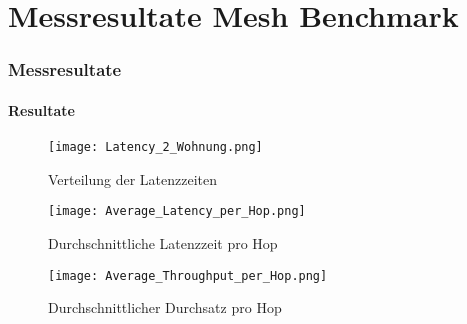 \vspace*{4cm}
\part{Messresultate Mesh Benchmark}\label{part:MessresultateMeshBenchmark}
\vspace*{\fill}
\clearpage

\section{Messresultate}\label{sec:MessresultateundDiskussion}




\subsection{Resultate}\label{subsec:Resultate}




\begin{figure}[h]
	\centering
	\texttt{[image: Latency\_2\_Wohnung.png]}
	\caption{Verteilung der Latenzzeiten}
	\label{fig:VerteilungderLatenzzeiten}
\end{figure}


\begin{figure}[!htbp]
\centering
\begin{minipage}[b]{0.49\textwidth}
		\centering
		\texttt{[image: Average\_Latency\_per\_Hop.png]}
		\caption{Durchschnittliche Latenzzeit pro Hop}
		\label{fig:DurchschnittlicheLatenzzeit}
\end{minipage}
\begin{minipage}[b]{0.49\textwidth}
		\centering
		\texttt{[image: Average\_Throughput\_per\_Hop.png]}
		\caption{Durchschnittlicher Durchsatz pro Hop}
		\label{fig:DurchschnittlicherDurchsatz}
\end{minipage}
\end{figure}



